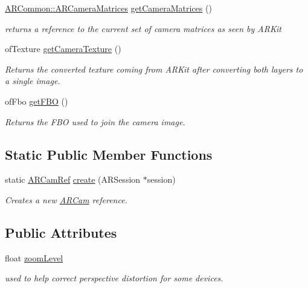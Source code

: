\begin{DoxyCompactItemize}
\hyperlink{struct_a_r_common_1_1_a_r_camera_matrices}{A\+R\+Common\+::\+A\+R\+Camera\+Matrices} \hyperlink{class_a_r_core_1_1_a_r_cam_a1398ffe9720425cfbc99635b08bc80d6}{get\+Camera\+Matrices} ()
\begin{DoxyCompactList}\small\item\em returns a reference to the current set of camera matrices as seen by A\+R\+Kit \end{DoxyCompactList}\item 
of\+Texture \hyperlink{class_a_r_core_1_1_a_r_cam_ae816096383bfc8fbcf6b67ab82b3d629}{get\+Camera\+Texture} ()
\begin{DoxyCompactList}\small\item\em Returns the converted texture coming from A\+R\+Kit after converting both layers to a single image. \end{DoxyCompactList}\item 
of\+Fbo \hyperlink{class_a_r_core_1_1_a_r_cam_a4c8f3c9b55f5852dc7a8554fe6ac0888}{get\+F\+BO} ()
\begin{DoxyCompactList}\small\item\em Returns the F\+BO used to join the camera image. \end{DoxyCompactList}\end{DoxyCompactItemize}
\subsection*{Static Public Member Functions}
\begin{DoxyCompactItemize}
\item 
static \hyperlink{namespace_a_r_core_a4ebe9e23907235fcf76bf65440fde0e0}{A\+R\+Cam\+Ref} \hyperlink{class_a_r_core_1_1_a_r_cam_ad4a6c0ebf786ea4e745cc8e95790681a}{create} (A\+R\+Session $\ast$session)
\begin{DoxyCompactList}\small\item\em Creates a new \hyperlink{class_a_r_core_1_1_a_r_cam}{A\+R\+Cam} reference. \end{DoxyCompactList}\end{DoxyCompactItemize}
\subsection*{Public Attributes}
\begin{DoxyCompactItemize}
\item 
float \hyperlink{class_a_r_core_1_1_a_r_cam_ac17d3b7fd12f51b2c54b7241efd36cd4}{zoom\+Level}
\begin{DoxyCompactList}\small\item\em used to help correct perspective distortion for some devices. \end{DoxyCompactList}\end{DoxyCompactItemize}


